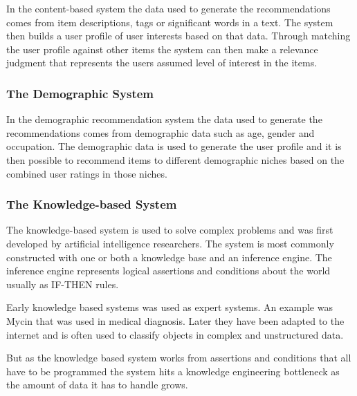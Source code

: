 In the content-based system the data used to generate the recommendations comes from item descriptions, tags or significant words in a text. The system then builds a user profile of user interests based on that data. Through matching the user profile against other items the system can then make a relevance judgment that represents the users assumed level of interest in the items. \cite{RecSysHandbook}


\subsubsection{The Demographic System}

In the demographic recommendation system the data used to generate the recommendations comes from demographic data such as age, gender and occupation. The demographic data is used to generate the user profile and it is then possible to recommend items to different demographic niches based on the combined user ratings in those niches. \cite{recWikipedia}


\subsubsection{The Knowledge-based System}

The knowledge-based system is used to solve complex problems and was first developed by artificial intelligence researchers. The system is most commonly constructed with one or both a knowledge base  and an inference engine. The inference engine represents logical assertions and conditions about the world usually as IF-THEN rules.

Early knowledge based systems was used as expert systems. An example was Mycin that was used in medical diagnosis. Later they have been adapted to the internet and is often used to classify objects in complex and unstructured data.

But as the knowledge based system works from assertions and conditions that all have to be programmed the system hits a knowledge engineering bottleneck as the amount of data it has to handle grows. \cite{knowledgeWikipedia}

